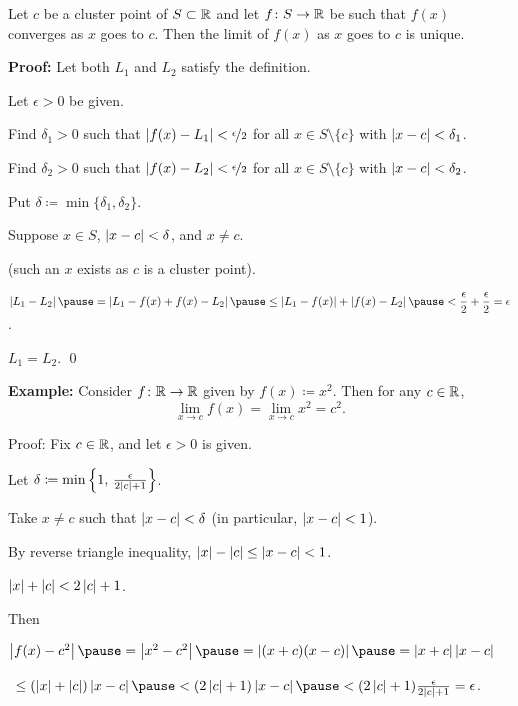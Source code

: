 \documentclass[10pt,aspectratio=149]{beamer}
\begin{document}
\begin{frame}

\begin{proposition}
Let $c$ be a cluster point of $S \subset {\mathbb{R}}$ and let $f \colon S \to {\mathbb{R}}$
be such that $f(x)$ converges as $x$ goes to $c$.
\pause
Then the limit of $f(x)$ as $x$ goes to $c$ is unique.
\end{proposition}

\pause
\textbf{Proof:}
Let both $L_1$ and $L_2$ satisfy the definition.

\pause
Let $\epsilon > 0$ be given.

\pause
Find $\delta_1 > 0$ such that $\left\lvert {f(x)-L_1} \right\rvert < \nicefrac{\epsilon}{2}$ 
for all $x \in S \setminus \{c\}$ with $\left\lvert {x-c} \right\rvert < \delta_1$.

\pause
Find $\delta_2 > 0$ such that $\left\lvert {f(x)-L_2} \right\rvert < \nicefrac{\epsilon}{2}$
for all $x \in S \setminus \{c\}$ with $\left\lvert {x-c} \right\rvert < \delta_2$.

\pause
Put $\delta \coloneqq \min \{ \delta_1, \delta_2 \}$.

\pause
Suppose $x \in S$, $\left\lvert {x-c} \right\rvert < \delta$, and $x \not= c$.

(such an $x$ exists as $c$ is a cluster point).

\pause
\medskip

$\displaystyle
\abs{L_1 - L_2}
\pause
=
\abs{L_1 - f(x) + f(x) - L_2}
\pause
\leq
\abs{L_1 - f(x)} + \abs{f(x) - L_2}
\pause
<
\frac{\epsilon}{2} + \frac{\epsilon}{2}
= \epsilon$.

\pause
\medskip

\thus \quad $L_1 = L_2$.
\qed
\end{frame}

\begin{frame}

\textbf{Example:}
Consider $f \colon {\mathbb{R}} \to {\mathbb{R}}$ given by $f(x) \coloneqq x^2$.  Then
for any $c \in {\mathbb{R}}$,
\begin{equation*}
\lim_{x\to c} f(x) = \lim_{x\to c} x^2 = c^2 .
\end{equation*}

\pause
Proof: Fix $c \in {\mathbb{R}}$, and let $\epsilon > 0$ is given.

\pause
Let $\delta \coloneqq \min \left\{ 1 , \, \frac{\epsilon}{2\left\lvert {c} \right\rvert+1} \right\}$.

\pause
Take $x \not= c$ such that $\left\lvert {x-c} \right\rvert < \delta$ (in particular, $\left\lvert {x-c} \right\rvert < 1$).

\pause
By reverse triangle inequality,
\quad
$\left\lvert {x} \right\rvert-\left\lvert {c} \right\rvert \leq \left\lvert {x-c} \right\rvert < 1$.

\pause
\thus \quad $\left\lvert {x} \right\rvert + \left\lvert {c} \right\rvert < 2\left\lvert {c} \right\rvert + 1$.

\pause
\medskip

Then

\medskip

$\abs{f(x) - c^2}
\pause
= \abs{x^2-c^2}
\pause
= \abs{(x+c)(x-c)}
\pause
= \abs{x+c}\abs{x-c}
$

\pause
\medskip

\qquad\qquad\,\!
$
\leq (\abs{x}+\abs{c})\abs{x-c}
\pause
< (2\abs{c}+1)\abs{x-c}
\pause
< (2\abs{c}+1)\frac{\epsilon}{2\abs{c}+1} = \epsilon$.

\end{frame}
\end{document}
